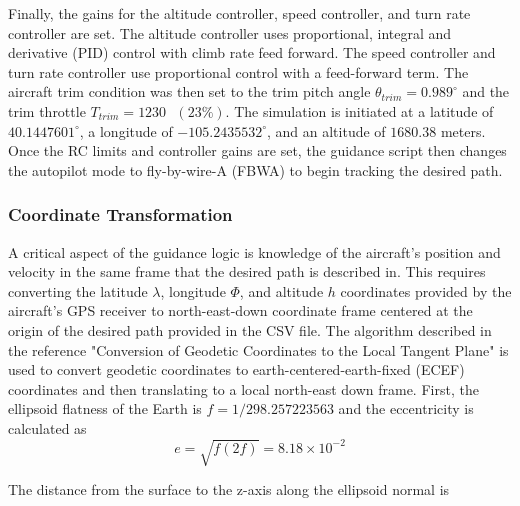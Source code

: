 \documentclass{aiaa}
\begin{document}

Finally, the gains for the altitude controller, speed controller, and turn rate controller are set. The altitude controller uses proportional, integral and derivative (PID) control with climb rate feed forward. The speed controller and turn rate controller use proportional control with a feed-forward term.
The aircraft trim condition was then set to the trim pitch angle $\theta_{trim} = 0.989^\circ$ and the trim throttle $T_{trim} = 1230\text{ } (23\%)$. The simulation is initiated at a latitude of $40.1447601^\circ$, a longitude of $-105.2435532^\circ$, and an altitude of $ 1680.38$ meters. Once the RC limits and controller gains are set, the guidance script then changes the autopilot mode to fly-by-wire-A (FBWA) to begin tracking the desired path.

\subsubsection{Coordinate Transformation}

A critical aspect of the guidance logic is knowledge of the aircraft's position and velocity in the same frame that the desired path is described in. This requires converting the latitude $\lambda$, longitude $\Phi$, and altitude $h$ coordinates provided by the aircraft's GPS receiver to north-east-down coordinate frame centered at the origin of the desired path provided in the CSV file. The algorithm described in the reference "Conversion of Geodetic Coordinates to the Local Tangent Plane" is used to convert geodetic coordinates to earth-centered-earth-fixed (ECEF) coordinates and then translating to a local north-east down frame. First, the ellipsoid flatness of the Earth is $f=1/298.257223563$ and the eccentricity is calculated as
\begin{equation}
e=\sqrt{f(2f)}=8.18\times10^{-2}
\end{equation}

The distance from the surface to the z-axis along the ellipsoid normal is
\end{document}
